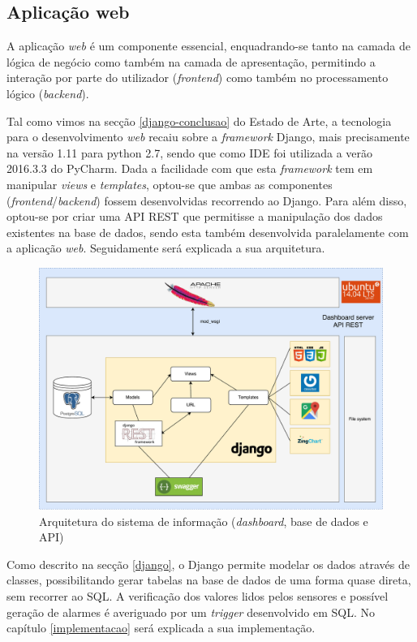 \subsection{Aplicação web}

A aplicação \textit{web} é um componente essencial, enquadrando-se tanto na camada de lógica de negócio como também na camada de apresentação, permitindo a interação por parte do utilizador (\textit{frontend}) como também no processamento lógico (\textit{backend}).   

Tal como vimos na secção \ref{django-conclusao} do Estado de Arte, a tecnologia para o desenvolvimento \textit{web} recaiu sobre a \textit{framework} Django, mais precisamente na versão 1.11 para python 2.7, sendo que como \ac{IDE} foi utilizada a verão 2016.3.3 do PyCharm. Dada a facilidade com que esta \textit{framework} tem em manipular \textit{views} e \textit{templates}, optou-se que ambas as componentes (\textit{frontend}/\textit{backend}) fossem desenvolvidas recorrendo ao Django. Para além disso, optou-se por criar uma API REST que permitisse a manipulação dos dados existentes na base de dados, sendo esta também desenvolvida paralelamente com a aplicação \textit{web}. Seguidamente será explicada a sua arquitetura.   


\newpage
\begin{figure}[h]
	\centering
	\includegraphics[width=\linewidth]{esquemas/fisica-si.pdf}
	\caption{Arquitetura do sistema de informação (\textit{dashboard}, base de dados e API)}
	\label{arquiteturasi}
\end{figure}




Como descrito na secção \ref{django}, o Django permite modelar os dados através de classes, possibilitando gerar tabelas na base de dados de uma forma quase direta, sem recorrer ao \ac{SQL}. A verificação dos valores lidos pelos sensores e possível geração de alarmes é averiguado por um \textit{trigger} desenvolvido em \ac{SQL}. No capítulo \ref{implementacao} será explicada a sua implementação.  


